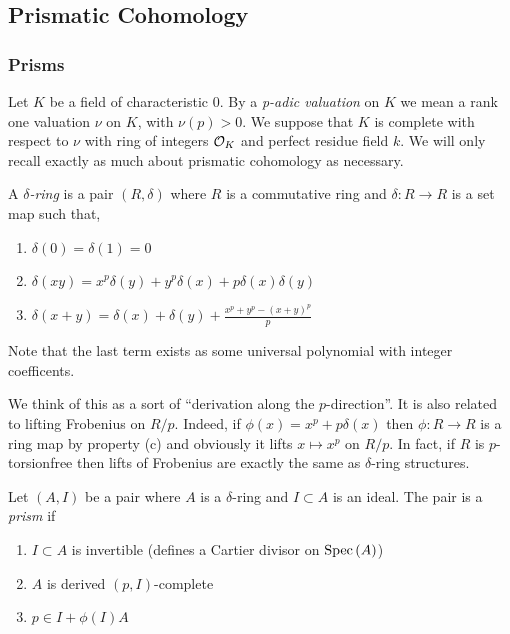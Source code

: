 \documentclass[12pt]{article}
\begin{document}
\subsection{Prismatic Cohomology}

\subsubsection{Prisms}

Let $K$ be a field of characteristic $0$. By a \textit{p-adic valuation} on $K$ we mean a rank one valuation $\nu$ on $K$, with $\nu(p) > 0$. We suppose that $K$ is complete with respect to $\nu$ with ring of integers $\mathcal{O}_K$ and perfect residue field $k$. We will only recall exactly as much about prismatic cohomology as necessary.

\begin{defn}
A $\delta$\textit{-ring} is a pair $(R, \delta)$ where $R$ is a commutative ring and $\delta : R \to R$ is a set map such that,
\begin{enumerate}
\item $\delta(0) = \delta(1) = 0$
\item $\delta(xy) = x^p \delta(y) + y^p \delta(x) + p \delta(x) \delta(y)$
\item $\delta(x + y) = \delta(x) + \delta(y) + \frac{x^p + y^p - (x+y)^p}{p}$
\end{enumerate}
Note that the last term exists as some universal polynomial with integer coefficents. 
\end{defn}

We think of this as a sort of ``derivation along the $p$-direction''. It is also related to lifting Frobenius on $R / p$. Indeed, if $\phi(x) = x^p + p \delta(x)$ then $\phi : R \to R$ is a ring map by property (c) and obviously it lifts $x \mapsto x^p$ on $R / p$. In fact, if $R$ is $p$-torsionfree then lifts of Frobenius are exactly the same as $\delta$-ring structures.

\begin{defn}
Let $(A, I)$ be a pair where $A$ is a $\delta$-ring and $I \subset A$ is an ideal. The pair is a \textit{prism} if
\begin{enumerate}
\item  $I \subset A$ is invertible (defines a Cartier divisor on $\mathrm{Spec}\left( A \right)$) 
\item $A$ is derived $(p,I)$-complete
\item $p \in I + \phi(I) A$
\end{enumerate}
\end{defn}
\end{document}
